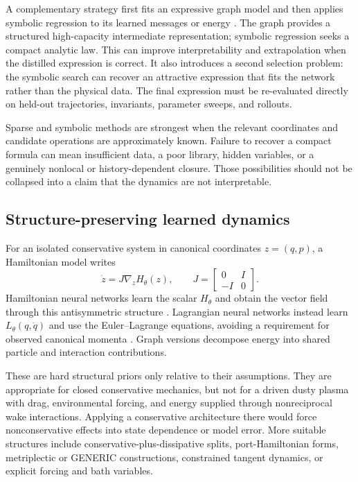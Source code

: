 A complementary strategy first fits an expressive graph model and then applies symbolic regression to its learned messages or energy \citep{cranmer2020symbolic}. The graph provides a structured high-capacity intermediate representation; symbolic regression seeks a compact analytic law. This can improve interpretability and extrapolation when the distilled expression is correct. It also introduces a second selection problem: the symbolic search can recover an attractive expression that fits the network rather than the physical data. The final expression must be re-evaluated directly on held-out trajectories, invariants, parameter sweeps, and rollouts.

Sparse and symbolic methods are strongest when the relevant coordinates and candidate operations are approximately known. Failure to recover a compact formula can mean insufficient data, a poor library, hidden variables, or a genuinely nonlocal or history-dependent closure. Those possibilities should not be collapsed into a claim that the dynamics are not interpretable.

\subsection{Structure-preserving learned dynamics}

For an isolated conservative system in canonical coordinates \(z=(q,p)\), a Hamiltonian model writes
\begin{equation}
\dot z=J\nabla_z H_\theta(z),
\qquad
J=
\begin{bmatrix}
0&I\\-I&0
\end{bmatrix}.
\end{equation}
Hamiltonian neural networks learn the scalar \(H_\theta\) and obtain the vector field through this antisymmetric structure \citep{greydanus2019hnn}. Lagrangian neural networks instead learn \(L_\theta(q,\dot q)\) and use the Euler--Lagrange equations, avoiding a requirement for observed canonical momenta \citep{cranmer2020lnn}. Graph versions decompose energy into shared particle and interaction contributions.

These are hard structural priors only relative to their assumptions. They are appropriate for closed conservative mechanics, but not for a driven dusty plasma with drag, environmental forcing, and energy supplied through nonreciprocal wake interactions. Applying a conservative architecture there would force nonconservative effects into state dependence or model error. More suitable structures include conservative-plus-dissipative splits, port-Hamiltonian forms, metriplectic or GENERIC constructions, constrained tangent dynamics, or explicit forcing and bath variables.

